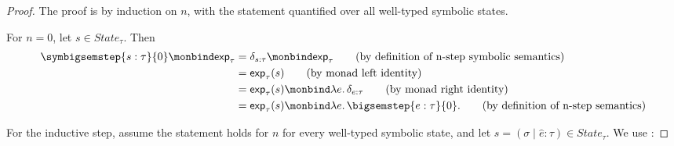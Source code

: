 \begin{proof}
  The proof is by induction on $n$, with the statement quantified over all
  well-typed symbolic states.

  For $n=0$, let $s \in State_\tau$. Then
  \begin{align}
    \symbigsemstep{s : \tau}{0}
    \monbind
    \mathsf{exp}_\tau
    &=
    \delta_{s : \tau}
    \monbind
    \mathsf{exp}_\tau
    \tag{\text{by definition of n-step symbolic semantics}} \\
    &=
    \mathsf{exp}_\tau(s)
    \tag{\text{by monad left identity}} \\
    &=
    \mathsf{exp}_\tau(s)
    \monbind
    \lambda e.\,\delta_{e : \tau}
    \tag{\text{by monad right identity}} \\
    &=
    \mathsf{exp}_\tau(s)
    \monbind
    \lambda e.\,\bigsemstep{e : \tau}{0}.
    \tag{\text{by definition of n-step semantics}}
  \end{align}

  For the inductive step, assume the statement holds for $n$ for every
  well-typed symbolic state, and let
  $s = (\sigma \mid \hat e : \tau) \in State_\tau$. We use
  :


\end{proof}
